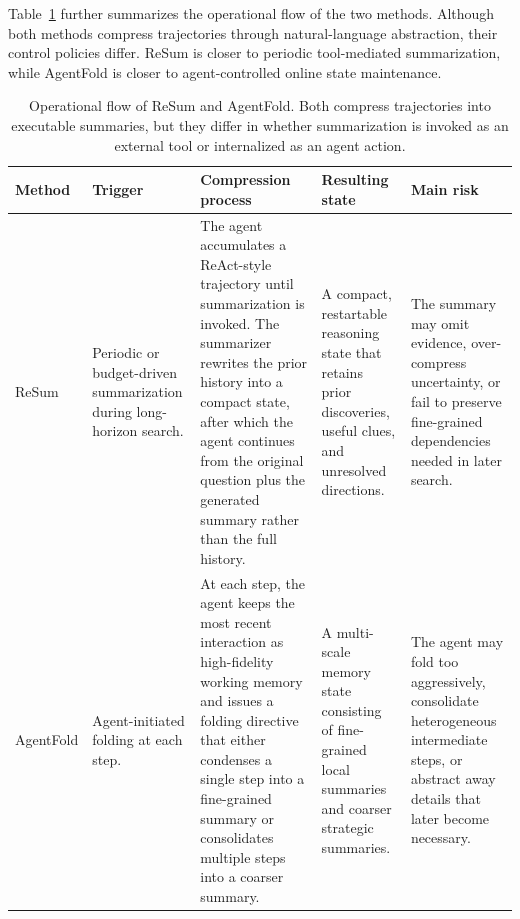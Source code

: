 Table~\ref{tab:app-c1-flow} further summarizes the operational flow of the two methods. Although both methods compress trajectories through natural-language abstraction, their control policies differ. ReSum is closer to periodic tool-mediated summarization, while AgentFold is closer to agent-controlled online state maintenance.

\begin{table}[t]
\centering
\small
\setlength{\tabcolsep}{3pt}
\renewcommand{\arraystretch}{1.08}

\begin{tabularx}{\textwidth}{@{}
>{\raggedright\arraybackslash}p{1.55cm}
>{\raggedright\arraybackslash}p{1.85cm}
>{\raggedright\arraybackslash}X
>{\raggedright\arraybackslash}X
>{\raggedright\arraybackslash}X
@{}}
\hline
\textbf{Method} & \textbf{Trigger} & \textbf{Compression process} & \textbf{Resulting state} & \textbf{Main risk} \\
\hline
ReSum \citep{wu2026resumunlockinglonghorizonsearch}
&
Periodic or budget-driven summarization during long-horizon search.
&
The agent accumulates a ReAct-style trajectory until summarization is invoked. The summarizer rewrites the prior history into a compact state, after which the agent continues from the original question plus the generated summary rather than the full history.
&
A compact, restartable reasoning state that retains prior discoveries, useful clues, and unresolved directions.
&
The summary may omit evidence, over-compress uncertainty, or fail to preserve fine-grained dependencies needed in later search.
\\
\hline
AgentFold \citep{ye2025agentfoldlonghorizonwebagents}
&
Agent-initiated folding at each step.
&
At each step, the agent keeps the most recent interaction as high-fidelity working memory and issues a folding directive that either condenses a single step into a fine-grained summary or consolidates multiple steps into a coarser summary.
&
A multi-scale memory state consisting of fine-grained local summaries and coarser strategic summaries.
&
The agent may fold too aggressively, consolidate heterogeneous intermediate steps, or abstract away details that later become necessary.
\\
\hline
\end{tabularx}
\caption{Operational flow of ReSum and AgentFold. Both compress trajectories into executable summaries, but they differ in whether summarization is invoked as an external tool or internalized as an agent action.}
\label{tab:app-c1-flow}
\end{table}

